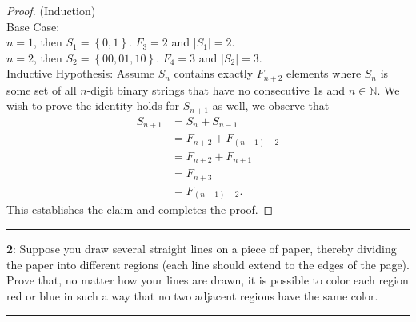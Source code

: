 \documentclass[11pt]{article}
\newcommand\question[2]{\vspace{.25in}\hrule\textbf{#1}: #2\vspace{.5em}\hrule\vspace{.10in}}
\newcommand{\N}{\mathbb{N}}
\begin{document}
	\begin{proof}
		(Induction)\\
		Base Case:\\
		$n=1$, then $S_1 = \left\{0, 1\right\}$. $F_3 = 2$ and $\left|S_1\right|= 2$.\\
		$n=2$, then $S_2 = \left\{00, 01, 10\right\}$. $F_4 = 3$ and $\left|S_2\right|= 3$.\\
		Inductive Hypothesis: Assume $S_n$ contains exactly $F_{n+2}$ elements where $S_n$ is some set of all $n$-digit binary strings that have no consecutive 1s and $n \in \N$. We wish to prove the identity holds for $S_{n+1}$ as well, we observe that
		\begin{align*}
			S_{n+1} &= S_n + S_{n-1}\\
			&= F_{n+2} + F_{(n-1)+2}\\
			&= F_{n+2} + F_{n+1}\\
			&= F_{n+3}\\
			&= F_{(n+1)+2}.
		\end{align*}
		This establishes the claim and completes the proof.
	\end{proof}

	\newpage

\question{2}{Suppose you draw several straight lines on a piece of paper, thereby dividing the paper into different regions (each line should extend to the edges of the page). Prove that, no matter how your lines are drawn, it is possible to color each region red or blue in such a way that no two adjacent regions have the same color.}
\end{document}
